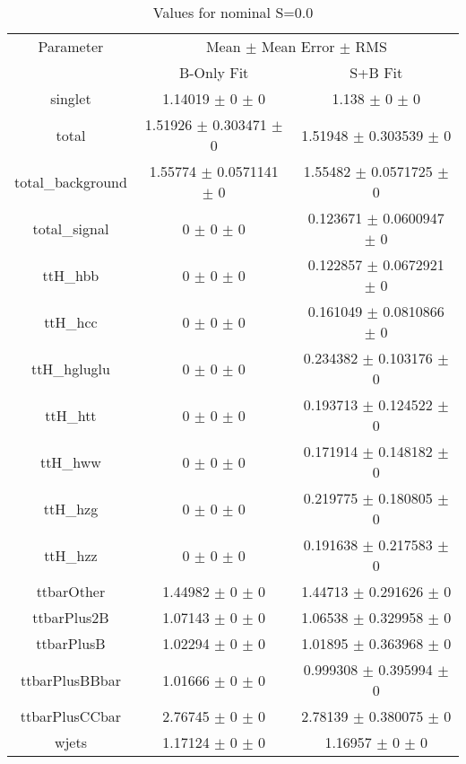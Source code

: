 \begin{table}
\centering
\caption{Values for nominal S=0.0}
\begin{tabular}{ccc}
\toprule
Parameter & \multicolumn{2}{c}{Mean $\pm$ Mean Error $\pm$ RMS}\\
 & B-Only Fit & S+B Fit\\
\midrule
singlet & \num{1.14019} $\pm$ \num{0} $\pm$ \num{0} & \num{1.138} $\pm$ \num{0} $\pm$ \num{0}\\
total & \num{1.51926} $\pm$ \num{0.303471} $\pm$ \num{0} & \num{1.51948} $\pm$ \num{0.303539} $\pm$ \num{0}\\
total\_background & \num{1.55774} $\pm$ \num{0.0571141} $\pm$ \num{0} & \num{1.55482} $\pm$ \num{0.0571725} $\pm$ \num{0}\\
total\_signal & \num{0} $\pm$ \num{0} $\pm$ \num{0} & \num{0.123671} $\pm$ \num{0.0600947} $\pm$ \num{0}\\
ttH\_hbb & \num{0} $\pm$ \num{0} $\pm$ \num{0} & \num{0.122857} $\pm$ \num{0.0672921} $\pm$ \num{0}\\
ttH\_hcc & \num{0} $\pm$ \num{0} $\pm$ \num{0} & \num{0.161049} $\pm$ \num{0.0810866} $\pm$ \num{0}\\
ttH\_hgluglu & \num{0} $\pm$ \num{0} $\pm$ \num{0} & \num{0.234382} $\pm$ \num{0.103176} $\pm$ \num{0}\\
ttH\_htt & \num{0} $\pm$ \num{0} $\pm$ \num{0} & \num{0.193713} $\pm$ \num{0.124522} $\pm$ \num{0}\\
ttH\_hww & \num{0} $\pm$ \num{0} $\pm$ \num{0} & \num{0.171914} $\pm$ \num{0.148182} $\pm$ \num{0}\\
ttH\_hzg & \num{0} $\pm$ \num{0} $\pm$ \num{0} & \num{0.219775} $\pm$ \num{0.180805} $\pm$ \num{0}\\
ttH\_hzz & \num{0} $\pm$ \num{0} $\pm$ \num{0} & \num{0.191638} $\pm$ \num{0.217583} $\pm$ \num{0}\\
ttbarOther & \num{1.44982} $\pm$ \num{0} $\pm$ \num{0} & \num{1.44713} $\pm$ \num{0.291626} $\pm$ \num{0}\\
ttbarPlus2B & \num{1.07143} $\pm$ \num{0} $\pm$ \num{0} & \num{1.06538} $\pm$ \num{0.329958} $\pm$ \num{0}\\
ttbarPlusB & \num{1.02294} $\pm$ \num{0} $\pm$ \num{0} & \num{1.01895} $\pm$ \num{0.363968} $\pm$ \num{0}\\
ttbarPlusBBbar & \num{1.01666} $\pm$ \num{0} $\pm$ \num{0} & \num{0.999308} $\pm$ \num{0.395994} $\pm$ \num{0}\\
ttbarPlusCCbar & \num{2.76745} $\pm$ \num{0} $\pm$ \num{0} & \num{2.78139} $\pm$ \num{0.380075} $\pm$ \num{0}\\
wjets & \num{1.17124} $\pm$ \num{0} $\pm$ \num{0} & \num{1.16957} $\pm$ \num{0} $\pm$ \num{0}\\
\bottomrule
\end{tabular}
\end{table}